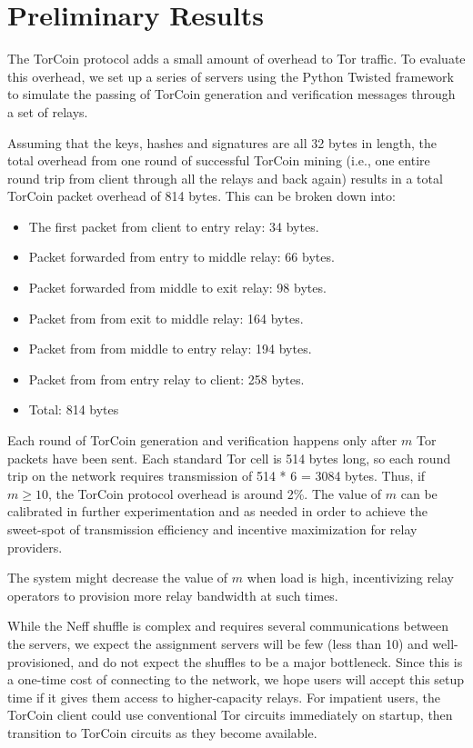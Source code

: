 \section{Preliminary Results}

The TorCoin protocol adds a small amount of overhead to Tor traffic. 
To evaluate this overhead,
we set up a series of servers using the Python Twisted
framework\cite{twisted} to simulate the passing of TorCoin generation and
verification messages through a set of relays.

Assuming that the keys, hashes and signatures are all 32 bytes in length,
the total overhead from one round of successful TorCoin mining (i.e., one entire
round trip from client through all the relays and back again) results in a total
TorCoin packet overhead of 814 bytes. This can be broken down into:

\begin{itemize}
	\item The first packet from client to entry relay: 34 bytes.
	\item Packet forwarded from entry to middle relay: 66 bytes.
	\item Packet forwarded from middle to exit relay: 98 bytes.
	\item Packet from from exit to middle relay: 164 bytes.
	\item Packet from from middle to entry relay: 194 bytes.
	\item Packet from from entry relay to client: 258 bytes.
	\item Total: 814 bytes
\end{itemize}



Each round of TorCoin generation and verification happens only after $m$ Tor
packets have been sent. Each standard Tor cell is 514 bytes long, so each
round trip on the network requires transmission of 514 * 6 = 3084 bytes. Thus,
if $m \geq 10$, the TorCoin protocol overhead is around 2\%. The value of $m$
can be calibrated in further experimentation and as needed in order to achieve
the sweet-spot of transmission efficiency and incentive maximization for relay
providers.

The system might decrease the value of $m$ when load is high,
incentivizing relay operators
to provision more relay bandwidth at such times.

While the Neff shuffle is complex and requires several
communications between the servers,
we expect the assignment servers will be few (less than 10)
and well-provisioned,
and do not expect the shuffles to be a major bottleneck.
Since this is a one-time cost of connecting to the network,
we hope users will accept this setup time
if it gives them access to higher-capacity relays.
For impatient users,
the TorCoin client could use conventional Tor circuits immediately on startup,
then transition to TorCoin circuits as they become available.

